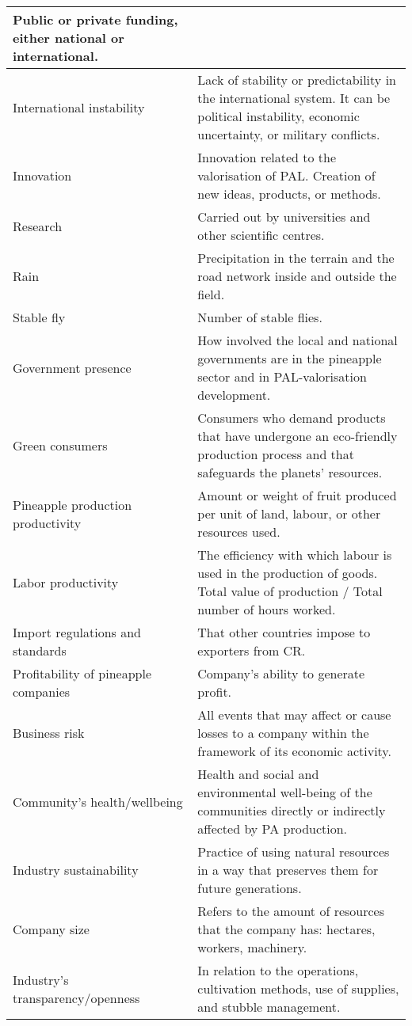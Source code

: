 \begin{table}[htp]
\begin{tabular}{p{}p{}}
  Public or private funding, either national or international. \\ \hline
International instability &
  Lack of stability or predictability in the international system. It can be political instability, economic uncertainty, or military conflicts. \\ \hline
Innovation &
  Innovation related to the valorisation of PAL. Creation of new ideas, products, or methods. \\ \hline
Research &
  Carried out by universities and other scientific centres. \\ \hline
Rain &
  Precipitation in the terrain and the road network inside and outside the field. \\ \hline
Stable fly &
  Number of stable flies. \\ \hline
Government presence &
  How involved the local and national governments are in the pineapple sector and in PAL-valorisation development. \\ \hline
Green consumers &
  Consumers who demand products that have undergone an eco-friendly production process and that safeguards the planets' resources. \\ \hline
Pineapple production productivity &
  Amount or weight of fruit produced per unit of land, labour, or other resources used. \\ \hline
Labor productivity &
  The efficiency with which labour is used in the production of goods. Total value of production / Total number of hours worked. \\ \hline
Import regulations and standards &
  That other countries impose to exporters from CR. \\ \hline
Profitability of pineapple companies &
  Company's ability to generate profit. \\ \hline
Business risk &
  All events that may affect or cause losses to a company within the framework of its economic activity. \\ \hline
Community's health/wellbeing &
  Health and social and environmental well-being of the communities directly or indirectly affected by PA production. \\ \hline
Industry sustainability &
  Practice of using natural resources in a way that preserves them for future generations. \\ \hline
Company  size &
  Refers to the amount of  resources that the company has: hectares, workers, machinery. \\ \hline
Industry's transparency/openness &
  In relation to the operations, cultivation methods, use of supplies, and stubble management. \\ \hline

\end{tabular}
\end{table}
